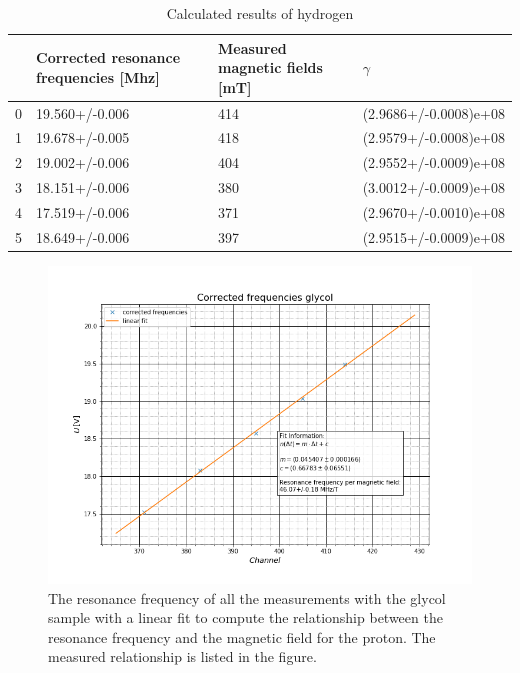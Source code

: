 \begin{table}
	\caption{Calculated results of hydrogen}
	\label{hydrogen}
	\begin{tabular}{llll}
		\toprule
		{} & Corrected resonance frequencies [Mhz] & Measured magnetic fields [mT] &               $\gamma$ \\
		\midrule
		0 &                        19.560+/-0.006 &                           414 &  (2.9686+/-0.0008)e+08 \\
		1 &                        19.678+/-0.005 &                           418 &  (2.9579+/-0.0008)e+08 \\
		2 &                        19.002+/-0.006 &                           404 &  (2.9552+/-0.0009)e+08 \\
		3 &                        18.151+/-0.006 &                           380 &  (3.0012+/-0.0009)e+08 \\
		4 &                        17.519+/-0.006 &                           371 &  (2.9670+/-0.0010)e+08 \\
		5 &                        18.649+/-0.006 &                           397 &  (2.9515+/-0.0009)e+08 \\
		\bottomrule
	\end{tabular}
\end{table}


\begin{figure}[h]
	\includegraphics[scale=0.5]{Bild/glycol}
	\centering
	\caption[Plot of the glycol resonance frequencies per magnetic field strength]{The resonance frequency of all the measurements with the glycol sample with a linear fit to compute the relationship between the resonance frequency and the magnetic field for the proton. The measured relationship is listed in the figure.}
	\label{glycol_pic}
\end{figure}


